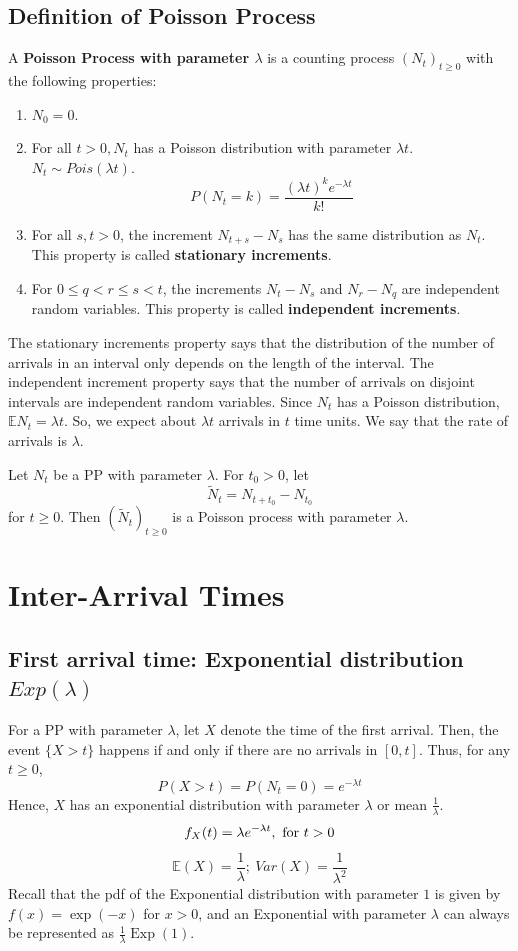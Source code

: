 \documentclass[11pt]{elegantbook}
\begin{document}
\subsection{Definition of Poisson Process}
\begin{definition}[Definition 1 of PP]
        A \textbf{Poisson Process with parameter $\lambda$} is a counting process $\left(N_t\right)_{t \geq 0}$ with the following properties:
        \begin{enumerate}
            \item $N_0=0$.
            \item For all $t>0, N_t$ has a Poisson distribution with parameter $\lambda t$. $N_t\sim Pois(\lambda t)$.
            $$P(N_t=k)=\frac{(\lambda t)^{k}e^{-\lambda t}}{k!}$$
            \item For all $s, t>0$, the increment $N_{t+s}-N_s$ has the same distribution as $N_t$. This property is called \textbf{stationary increments}.
            \item For $0 \leq q<r \leq s<t$, the increments $N_t-N_s$ and $N_r-N_q$ are independent random variables. This property is called \textbf{independent increments}.
        \end{enumerate}
\end{definition}
The stationary increments property says that the distribution of the number of arrivals in an interval only depends on the length of the interval. The independent increment property says that the number of arrivals on disjoint intervals are independent random variables. Since $N_t$ has a Poisson distribution, $\mathbb{E} N_t=\lambda t$. So, we expect about $\lambda t$ arrivals in $t$ time units. We say that the rate of arrivals is $\lambda$.
\begin{proposition}[Translated PP]
    Let $N_t$ be a PP with parameter $\lambda$. For $t_0 > 0$, let $$\tilde{N}_t=N_{t+t_0}-N_{t_0}$$ for $t\geq 0$. Then $(\tilde{N}_t)_{t\geq 0}$ is a Poisson process with parameter $\lambda$.
\end{proposition}

\section{Inter-Arrival Times}
\subsection{First arrival time: Exponential distribution $Exp(\lambda)$}
For a PP with parameter $\lambda$, let $X$ denote the time of the first arrival. Then, the event $\{X>t\}$ happens if and only if there are no arrivals in $[0, t]$. Thus, for any $t \geq 0$,
$$
P(X>t)=P\left(N_t=0\right)=e^{-\lambda t}
$$
Hence, $X$ has an exponential distribution with parameter $\lambda$ or mean $\frac{1}{\lambda}$.
$$f_{X}(t)=\lambda e^{-\lambda t},\ \textnormal{for } t>0$$
$$\mathbb{E}(X)=\frac{1}{\lambda};\ Var(X)=\frac{1}{\lambda^2}$$
Recall that the pdf of the Exponential distribution with parameter $1$ is given by $f(x)=\exp (-x)$ for $x>0$, and an Exponential with parameter $\lambda$ can always be represented as $\frac{1}{\lambda} \operatorname{Exp}(1)$.
\end{document}
